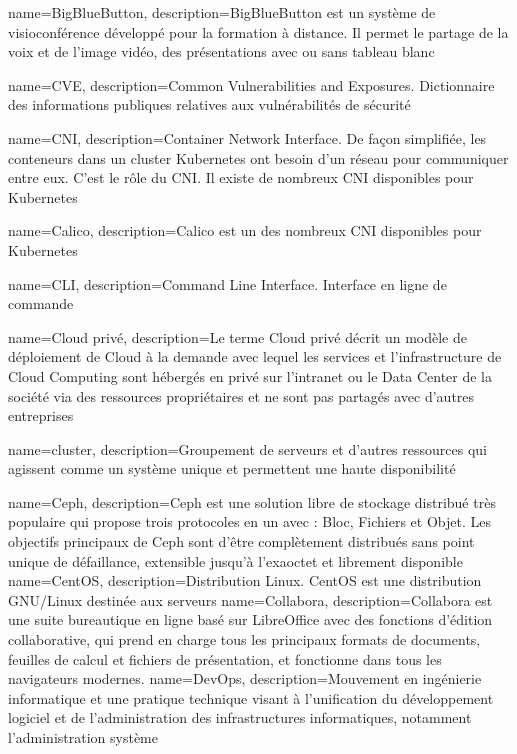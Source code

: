 {
    name=BigBlueButton,
    description={BigBlueButton est un système de visioconférence développé pour la formation à distance. Il permet le partage de la voix et de l'image vidéo, des présentations avec ou sans tableau blanc}
}

{
    name=CVE,
    description={Common Vulnerabilities and Exposures. Dictionnaire des informations publiques relatives aux vulnérabilités de sécurité}
}

{
    name=CNI,
    description={Container Network Interface. De façon simplifiée, les conteneurs dans un cluster Kubernetes ont besoin d'un réseau pour communiquer entre eux. C'est le rôle du CNI. Il existe de nombreux CNI disponibles pour Kubernetes}
}

{
    name=Calico,
    description={Calico est un des nombreux CNI disponibles pour Kubernetes}
}

{
    name=CLI,
    description={Command Line Interface. Interface en ligne de commande}
}

{
    name=Cloud privé,
    description={Le terme Cloud privé décrit un modèle de déploiement de Cloud à la demande avec lequel les services et l'infrastructure de Cloud Computing sont hébergés en privé sur l'intranet ou le Data Center de la société via des ressources propriétaires et ne sont pas partagés avec d'autres entreprises}
}

{
    name=cluster,
    description={Groupement de serveurs et d’autres ressources qui agissent comme un système unique et permettent une haute disponibilité}
}

{
    name=Ceph,
    description={Ceph est une solution libre de stockage distribué très populaire qui propose trois protocoles en un avec : Bloc, Fichiers et Objet. Les objectifs principaux de Ceph sont d'être complètement distribués sans point unique de défaillance, extensible jusqu'à l'exaoctet et librement disponible}
}
{
    name=CentOS,
    description={Distribution Linux. CentOS est une distribution GNU/Linux destinée aux serveurs}
}
{
    name=Collabora,
    description={Collabora est une suite bureautique en ligne basé sur LibreOffice avec des fonctions d'édition collaborative, qui prend en charge tous les principaux formats de documents, feuilles de calcul et fichiers de présentation, et fonctionne dans tous les navigateurs modernes.}
}
{
    name=DevOps,
    description={Mouvement en ingénierie informatique et une pratique technique visant à l'unification du développement logiciel et de l'administration des infrastructures informatiques, notamment l'administration système}
}


